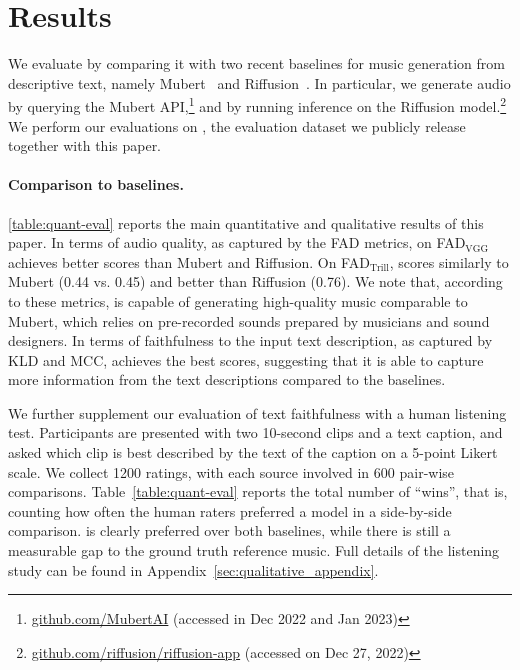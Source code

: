 \section{Results}
\label{results}

We evaluate {\model} by comparing it with two recent baselines for music generation from descriptive text, namely Mubert~\cite{Mubert} and Riffusion~\cite{riffusion}. 
In particular, we generate audio by querying the Mubert API,\footnote{\href{https://github.com/MubertAI}{github.com/MubertAI} (accessed in Dec 2022 and Jan 2023)} and by running inference on the Riffusion model.\footnote{\href{https://github.com/riffusion/riffusion-app}{github.com/riffusion/riffusion-app} (accessed on Dec 27, 2022)}
We perform our evaluations on {\dataset}, the evaluation dataset we publicly release together with this paper.

\paragraph{Comparison to baselines.}
\label{results/comparison}

\cref{table:quant-eval} reports the main quantitative and qualitative results of this paper. In terms of audio quality, as captured by the FAD metrics, on FAD$_{\text{VGG}}$ {\model} achieves better scores than Mubert and Riffusion. On FAD$_{\text{Trill}}$, {\model} scores similarly to Mubert (0.44 vs. 0.45) and better than Riffusion (0.76).
We note that, according to these metrics, {\model} is capable of generating high-quality music comparable to Mubert, which relies on pre-recorded sounds prepared by musicians and sound designers.
In terms of faithfulness to the input text description, as captured by KLD and MCC, {\model} achieves the best scores, suggesting that it is able to capture more information from the text descriptions compared to the baselines.

We further supplement our evaluation of text faithfulness with a human listening test. 
Participants are presented with two 10-second clips and a text caption, and asked which clip is best described by the text of the caption on a 5-point Likert scale. 
We collect 1200 ratings, with each source involved in 600 pair-wise comparisons. Table~\ref{table:quant-eval} reports the total number of ``wins'', that is, counting how often the human raters preferred a model in a side-by-side comparison. 
{\model} is clearly preferred over both baselines, while there is still a measurable gap to the ground truth reference music. Full details of the listening study can be found in Appendix~\ref{sec:qualitative_appendix}.


